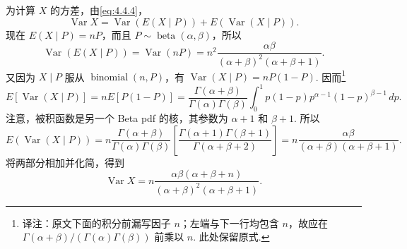 \begin{example}[续\autoref{ex:4.4.6}]\label{ex:4.4.8}
为计算 $X$ 的方差，由\eqref{eq:4.4.4}，
$$\operatorname{Var}X=\operatorname{Var}(E(X\mid P))+E(\operatorname{Var}(X\mid P)).$$
现在 $E(X\mid P)=nP$，而且 $P\sim\operatorname{beta}(\alpha,\beta)$，所以
$$\operatorname{Var}(E(X\mid P))=\operatorname{Var}(nP)=n^2\frac{\alpha\beta}{(\alpha+\beta)^2(\alpha+\beta+1)}.$$
又因为 $X\mid P$ 服从 $\operatorname{binomial}(n,P)$，有 $\operatorname{Var}(X\mid P)=nP(1-P)$. 因而\footnote{译注：原文下面的积分前漏写因子 $n$；左端与下一行均包含 $n$，故应在 $\Gamma(\alpha+\beta)/(\Gamma(\alpha)\Gamma(\beta))$ 前乘以 $n$. 此处保留原式.}
$$E[\operatorname{Var}(X\mid P)]=nE[P(1-P)]=\frac{\Gamma(\alpha+\beta)}{\Gamma(\alpha)\Gamma(\beta)}\int_0^1 p(1-p)p^{\alpha-1}(1-p)^{\beta-1}\,dp.$$
注意，被积函数是另一个 Beta pdf 的核，其参数为 $\alpha+1$ 和 $\beta+1$. 所以
$$E(\operatorname{Var}(X\mid P))=n\frac{\Gamma(\alpha+\beta)}{\Gamma(\alpha)\Gamma(\beta)}\left[\frac{\Gamma(\alpha+1)\Gamma(\beta+1)}{\Gamma(\alpha+\beta+2)}\right]
=n\frac{\alpha\beta}{(\alpha+\beta)(\alpha+\beta+1)}.$$
将两部分相加并化简，得到
$$\operatorname{Var}X=n\frac{\alpha\beta(\alpha+\beta+n)}{(\alpha+\beta)^2(\alpha+\beta+1)}.$$
\end{example}
